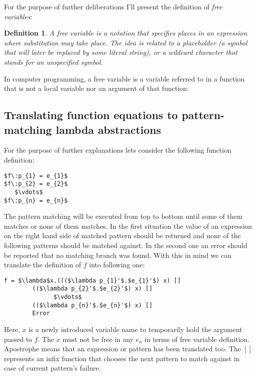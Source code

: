 \documentclass[12pt,a4paper]{report}
\newtheorem{definition}{Definition}[chapter]
\begin{document}
For the purpose of further deliberations I'll present the definition of
\textit{free variables}:
\begin{definition}
  \label{def:free_variable}
  A free variable is a notation that specifies places in an expression where
  substitution may take place. The idea is related to a placeholder (a symbol
  that will later be replaced by some literal string), or a wildcard character
  that stands for an unspecified symbol.
\end{definition}

In computer programming, a free variable is a variable referred to in a
function that is not a local variable nor an argument of that function:

\subsection{Translating function equations to pattern-matching lambda
abstractions}
For the purpose of further explanations lets consider the following function
definition:

\hspace*{-1.5in}
\begin{lstlisting}[style=haskell,mathescape=true]
$f\:p_{1} = e_{1}$
$f\:p_{2} = e_{2}$
   $\vdots$
$f\:p_{n} = e_{n}$
\end{lstlisting}

The pattern matching will be executed from top to bottom until some of them
matches or none of them matches. In the first situation the value of an
expression on the right hand side of matched pattern should be returned and
none of the following patterns should be matched against. In the second one an
error should be reported that no matching branch was found. With this in mind
we can translate the definition of $f$ into following one:

\hspace*{-1.5in}
\begin{lstlisting}[style=haskell,mathescape=true]
f = $\lambda$x.((($\lambda p_{1}'$.$e_{1}'$) x) []
        (($\lambda p_{2}'$.$e_{2}'$) x) []
              $\vdots$
        (($\lambda p_{n}'$.$e_{n}'$) x) []
        Error
\end{lstlisting}
Here, $x$ is a newly introduced variable name to temporarily hold the argument
passed to $f$. The $x$ must not be free in any $e_{n}$ in terms of free
variable definition. Apostrophe means that an expression or pattern has been
translated too. The $[]$ represents an infix function that chooses the next
pattern to match against in case of current pattern's failure.
\end{document}
